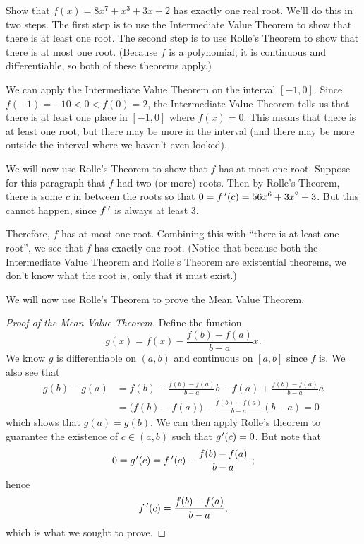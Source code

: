 \begin{example}\label{ex_rolle1}%
Show that $f(x)=8x^7+x^3+3x+2$ has exactly one real root.
\solution
We'll do this in two steps.  The first step is to use the Intermediate Value Theorem to show that there is at least one root.  The second step is to use Rolle's Theorem to show that there is at most one root.  (Because $f$ is a polynomial, it is continuous and differentiable, so both of these theorems apply.)

We can apply the Intermediate Value Theorem on the interval $[-1,0]$.  Since $f(-1)=-10<0<f(0)=2$, the Intermediate Value Theorem tells us that there is at least one place in $[-1,0]$ where $f(x)=0$.  This means that there is at least one root, but there may be more in the interval (and there may be more outside the interval where we haven't even looked).

We will now use Rolle's Theorem to show that $f$ has at most one root. Suppose for this paragraph that $f$ had two (or more) roots. Then by Rolle's Theorem, there is some $c$ in between the roots so that $0=f\,'(c)=56x^6+3x^2+3$. But this cannot happen, since $f\,'$ is always at least 3.

Therefore, $f$ has at most one root.  Combining this with ``there is at least one root'', we see that $f$ has exactly one root.  (Notice that because both the Intermediate Value Theorem and Rolle's Theorem are existential theorems, we don't know what the root is, only that it must exist.)
\end{example}

We will now use Rolle's Theorem to prove the Mean Value Theorem.

\begin{proof}[Proof of the Mean Value Theorem]
Define the function
\[g(x) = f(x) - \frac{f(b)-f(a)}{b-a}x.\]
We know $g$ is differentiable on $(a,b)$ and  continuous on $[a,b]$ since $f$ is.  We also see that
\begin{align*}
g(b)-g(a)&=f(b)-\frac{f(b)-f(a)}{b-a}b-f(a)+\frac{f(b)-f(a)}{b-a}a\\
&=\bigl(f(b)-f(a)\bigr)-\frac{f(b)-f(a)}{b-a}(b-a)=0
\end{align*}
which shows that $g(a)=g(b)$. We can then apply Rolle's theorem to guarantee the existence of $c \in (a,b)$ such that $g\primeskip'(c) = 0$.  But note that
\[0= g\primeskip'(c) = \fp(c) - \frac{f(b)-f(a)}{b-a} \ ;\]
hence
\[f\,'(c) = \frac{f(b)-f(a)}{b-a},\]
which is what we sought to prove.
\end{proof}

